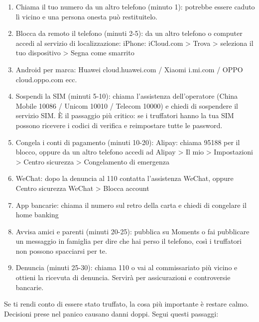 \begin{enumerate}
  \item Chiama il tuo numero da un altro telefono (minuto 1): potrebbe essere caduto lì vicino e una persona onesta può restituitelo.
  \item Blocca da remoto il telefono (minuti 2-5): da un altro telefono o computer accedi al servizio di localizzazione: iPhone: iCloud.com > Trova > seleziona il tuo dispositivo > Segna come smarrito
  \item Android per marca: Huawei cloud.huawei.com / Xiaomi i.mi.com / OPPO cloud.oppo.com ecc.
  \item Sospendi la SIM (minuti 5-10): chiama l'assistenza dell'operatore (China Mobile 10086 / Unicom 10010 / Telecom 10000) e chiedi di sospendere il servizio SIM. È il passaggio più critico: se i truffatori hanno la tua SIM possono ricevere i codici di verifica e reimpostare tutte le password.
  \item Congela i conti di pagamento (minuti 10-20): Alipay: chiama 95188 per il blocco, oppure da un altro telefono accedi ad Alipay > Il mio > Impostazioni > Centro sicurezza > Congelamento di emergenza
  \item WeChat: dopo la denuncia al 110 contatta l'assistenza WeChat, oppure Centro sicurezza WeChat > Blocca account
  \item App bancarie: chiama il numero sul retro della carta e chiedi di congelare il home banking
  \item Avvisa amici e parenti (minuti 20-25): pubblica su Moments o fai pubblicare un messaggio in famiglia per dire che hai perso il telefono, così i truffatori non possono spacciarsi per te.
  \item Denuncia (minuti 25-30): chiama 110 o vai al commissariato più vicino e ottieni la ricevuta di denuncia. Servirà per assicurazioni e controversie bancarie.
\end{enumerate}


Se ti rendi conto di essere stato truffato, la cosa più importante è restare calmo. Decisioni prese nel panico causano danni doppi. Segui questi passaggi:

